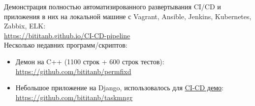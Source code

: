 \documentclass[$fontsize$, a4paper]{article}
\begin{document}
Демонстрация полностью автоматизированного развертывания CI/CD и приложения в них на локальной машине с Vagrant, Ansible, Jenkins, Kubernetes, Zabbix, ELK:\\
\url{https://bititanb.github.io/CI-CD-pipeline}\\

Несколько недавних программ/скриптов:
\begin{itemize}
  \item Демон на C++ (1100 строк + 600 строк тестов):\\
    \url{https://github.com/bititanb/permfixd}
  \item Небольшое приложение на Django, использовалось для \href{https://github.com/bititanb/CI-CD-pipeline}{CI-CD демо}:\\
    \url{https://github.com/bititanb/taskmngr}
\end{itemize}







\end{document}
